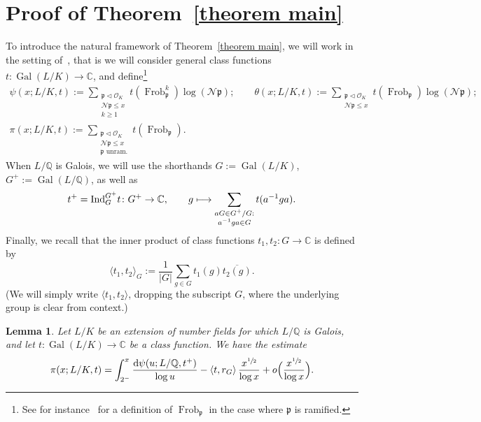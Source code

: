 \documentclass[JEP,XML,SOM,Unicode,NoEqCountersInSection,NoFloatCountersInSection,published]{cedram}
\let\mathcal\mathscr
\def\mto{\mathchoice{\longmapsto}{\mapsto}{\mapsto}{\mapsto}}
\DeclareMathOperator{\Frob}{Frob}
\newtheorem{lemma}[X]{Lemma}
\theoremstyle{definition}
\DeclareMathOperator{\Gal}{Gal}
\newcommand{\Q}{\mathbb Q}
\renewcommand{\d}{\mathrm{d}}
\begin{document}
\section{Proof of Theorem~\ref{theorem main}}\label{sec:mainproof}

To introduce the natural framework of Theorem~\ref{theorem main}, we will work in the setting of~\cite{Be}, that is we will consider general class functions $t\colon\Gal(L/K)\to \mathbb C$, and define\footnote{See for instance~\cite[Chap.\,1 \S4]{Mar} for a definition of $\Frob_\mathfrak p$ in the case where $\mathfrak p$ is ramified.}
\begin{gather*}
\psi(x;L/K,t):= \sum_{\substack{\mathfrak p\triangleleft \mathcal O_K\\ \mathcal N\mathfrak p \leq x \\ k\geq 1 }} t(\Frob_\mathfrak p^k) \log (\mathcal N\mathfrak p);\qquad \theta(x;L/K,t):= \sum_{\substack{\mathfrak p\triangleleft \mathcal O_K\\ \mathcal N\mathfrak p \leq x }} t(\Frob_\mathfrak p)\log (\mathcal N\mathfrak p);\\[-5pt]
\pi(x;L/K,t):= \sum_{\substack{\mathfrak p\triangleleft \mathcal O_K\\ \mathcal N\mathfrak p \leq x \\ \mathfrak p \text{ unram.}}} t(\Frob_\mathfrak p).
\end{gather*}
When $L/\Q$ is Galois, we will use the shorthands $G:=\Gal(L/K)$, $G^+:=\Gal(L/\Q)$, as well as
\[ t^+ = \mathrm{Ind}_G^{G^+} t \colon G^+\to \mathbb C,\qquad g\mto \sum_{\substack{aG\in G^+/G : \\a^{-1} g a \in G }} t(a^{-1} g a).
\]
Finally, we recall that the inner product of class functions $t_1,t_2\colon G \to \mathbb C$ is defined by
\[ \langle t_1 , t_2 \rangle_G := \frac 1{|G|} \sum_{g\in G} t_1(g)\overline{t_2(g)}. \]
(We will simply write $\langle t_1,t_2\rangle$, dropping the subscript $G$, where the underlying group is clear from context.)

\begin{lemma}
\label{lemma mobius and sbp}
Let $L/K$ be an extension of number fields for which $L/\Q$ is Galois, and let $t\colon\Gal(L/K)\to \mathbb C$ be a class function. We have the estimate
\[ \pi(x;L/K,t) = \int_{2^-}^x \frac{\d \psi(u;L/\Q,t^+) }{\log u} -\langle t,r_G \rangle\, \frac{x^{\sfrac 12}}{\log x}+ o\Big(\frac{x^{\sfrac 12}}{\log x}\Big). \]
\end{lemma}
\end{document}
